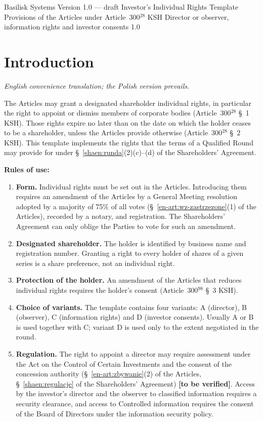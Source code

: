 \documentclass[11pt,a4paper]{report}
\newcommand{\field}[1]{\textbf{[#1]}}
\newcommand{\US}[1]{\S~#1 of the Articles}
\newcommand{\UA}[1]{\S~#1 of the Shareholders' Agreement}
\begin{document}
\BusinessPlanTitlePage
  {Basilisk Systems}
  {Version 1.0 --- draft}
  {Investor's Individual Rights}
  {Template Provisions of the Articles under Article~300$^{28}$ KSH}
  {Director or observer, information rights and investor consents}
  {1.0}

\tableofcontents
\newpage

\chapter*{Introduction}

{\small\itshape English convenience translation; the Polish version prevails.\par}

The Articles may grant a designated shareholder individual rights, in particular the right to appoint or dismiss members of corporate bodies (Article~300$^{28}$ \S~1 KSH). Those rights expire no later than on the date on which the holder ceases to be a shareholder, unless the Articles provide otherwise (Article~300$^{28}$ \S~2 KSH). This template implements the rights that the terms of a Qualified Round may provide for under \UA{\ref{shaen:runda}(2)(c)--(d)}.

\textbf{Rules of use:}
\begin{enumerate}
  \item \textbf{Form.} Individual rights must be set out in the Articles. Introducing them requires an amendment of the Articles by a General Meeting resolution adopted by a majority of 75\% of all votes (\US{\ref{en-art:wz-zastrzezone}(1)}), recorded by a notary, and registration. The Shareholders' Agreement can only oblige the Parties to vote for such an amendment.
  \item \textbf{Designated shareholder.} The holder is identified by business name and registration number. Granting a right to every holder of shares of a given series is a share preference, not an individual right.
  \item \textbf{Protection of the holder.} An amendment of the Articles that reduces individual rights requires the holder's consent (Article~300$^{98}$ \S~3 KSH).
  \item \textbf{Choice of variants.} The template contains four variants: A (director), B (observer), C (information rights) and D (investor consents). Usually A or B is used together with C; variant D is used only to the extent negotiated in the round.
  \item \textbf{Regulation.} The right to appoint a director may require assessment under the Act on the Control of Certain Investments and the consent of the concession authority (\US{\ref{en-art:zbywanie}(2)}, \UA{\ref{shaen:regulacje}}) \field{to be verified}. Access by the investor's director and the observer to classified information requires a security clearance, and access to Controlled information requires the consent of the Board of Directors under the information security policy.
\end{enumerate}
\end{document}
